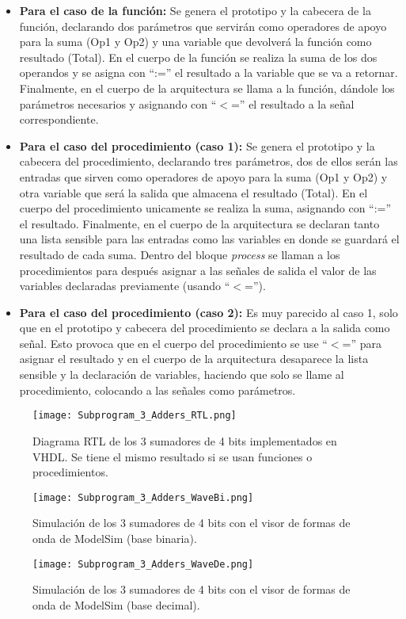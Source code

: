 \begin{itemize}
	\item \textbf{Para el caso de la función:} Se genera el prototipo y la cabecera de la función, declarando dos parámetros que servirán como operadores de apoyo para la suma (Op1 y Op2) y una variable que devolverá la función como resultado (Total). En el cuerpo de la función se realiza la suma de los dos operandos y se asigna con ``:='' el resultado a la variable que se va a retornar. Finalmente, en el cuerpo de la arquitectura se llama a la función, dándole los parámetros necesarios y asignando con ``$<$='' el resultado a la señal correspondiente.
	\item \textbf{Para el caso del procedimiento (caso 1):} Se genera el prototipo y la cabecera del procedimiento, declarando tres parámetros, dos de ellos serán las entradas que sirven como operadores de apoyo para la suma (Op1 y Op2) y otra variable que será la salida que almacena el resultado (Total). En el cuerpo del procedimiento unicamente se realiza la suma, asignando con ``:='' el resultado. Finalmente, en el cuerpo de la arquitectura se declaran tanto una lista sensible para las entradas como las variables en donde se guardará el resultado de cada suma. Dentro del bloque \textit{process} se llaman a los procedimientos para después asignar a las señales de salida el valor de las variables declaradas previamente (usando ``$<$='').
	\item \textbf{Para el caso del procedimiento (caso 2):} Es muy parecido al caso 1, solo que en el prototipo y cabecera del procedimiento se declara a la salida como señal. Esto provoca que en el cuerpo del procedimiento se use ``$<$='' para asignar el resultado y en el cuerpo de la arquitectura desaparece la lista sensible y la declaración de variables, haciendo que solo se llame al procedimiento, colocando a las señales como parámetros.
\end{itemize}

\begin{figure}[ht]
	\centering
	\texttt{[image: Subprogram\_3\_Adders\_RTL.png]}
	\caption{Diagrama RTL de los 3 sumadores de 4 bits implementados en VHDL. Se tiene el mismo resultado si se usan funciones o procedimientos. \label{fig:subprogram_3_adders_rtl_vhdl}}
\end{figure}

\begin{figure}[ht]
	\centering
	\texttt{[image: Subprogram\_3\_Adders\_WaveBi.png]}
	\caption{Simulación de los 3 sumadores de 4 bits con el visor de formas de onda de ModelSim (base binaria). \label{fig:subprogram_3_adders_wavebi_vhdl}}
\end{figure}

\begin{figure}[ht]
	\centering
	\texttt{[image: Subprogram\_3\_Adders\_WaveDe.png]}
	\caption{Simulación de los 3 sumadores de 4 bits con el visor de formas de onda de ModelSim (base decimal). \label{fig:subprogram_3_adders_wavede_vhdl}}
\end{figure}
